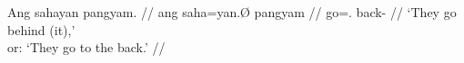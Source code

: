\a\begingl
	\gla Ang sahayan pangyam. //
	\glb ang saha=yan.Ø pangyam //
	\glc \AgtT{} go=\Tpl{}.\Top{} back-\Dat{} //
	\glft `They go behind (it),'\\
		or: `They go to the back.' //
\endgl

\xe

% 
% 
% 
% 
% 
% 
% 
% 

